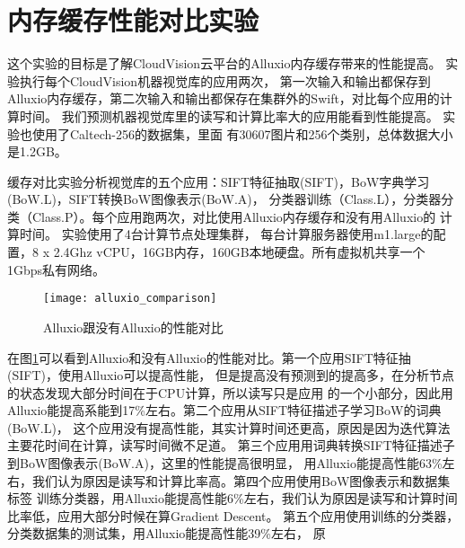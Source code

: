 \section{内存缓存性能对比实验}
\label{sec:memory-cache-experiment}
这个实验的目标是了解CloudVision云平台的Alluxio内存缓存带来的性能提高。
实验执行每个CloudVision机器视觉库的应用两次，
第一次输入和输出都保存到Alluxio内存缓存，第二次输入和输出都保存在集群外的Swift，对比每个应用的计算时间。
我们预测机器视觉库里的读写和计算比率大的应用能看到性能提高。
实验也使用了Caltech-256的数据集，里面
有30607图片和256个类别，总体数据大小是1.2GB。

缓存对比实验分析视觉库的五个应用：SIFT特征抽取(SIFT)，BoW字典学习(BoW.L)，SIFT转换BoW图像表示(BoW.A)，
分类器训练（Class.L），分类器分类（Class.P）。每个应用跑两次，对比使用Alluxio内存缓存和没有用Alluxio的
计算时间。
实验使用了4台计算节点处理集群，
每台计算服务器使用m1.large的配置，8 x 2.4Ghz vCPU，16GB内存，160GB本地硬盘。所有虚拟机共享一个
1Gbps私有网络。

\begin{figure}[h]
  \centering
    \texttt{[image: alluxio\_comparison]}
  \caption{Alluxio跟没有Alluxio的性能对比}
  \label{fig:alluxio-comparison}
\end{figure}

在图\ref{fig:alluxio-comparison}可以看到Alluxio和没有Alluxio的性能对比。第一个应用SIFT特征抽(SIFT)，使用Alluxio可以提高性能，
但是提高没有预测到的提高多，在分析节点的状态发现大部分时间在于CPU计算，所以读写只是应用
的一个小部分，因此用Alluxio能提高系能到17\%左右。第二个应用从SIFT特征描述子学习BoW的词典(BoW.L)，
这个应用没有提高性能，其实计算时间还更高，原因是因为迭代算法主要花时间在计算，读写时间微不足道。
第三个应用用词典转换SIFT特征描述子到BoW图像表示(BoW.A)，这里的性能提高很明显，
用Alluxio能提高性能63\%左右，我们认为原因是读写和计算比率高。第四个应用使用BoW图像表示和数据集标签
训练分类器，用Alluxio能提高性能6\%左右，我们认为原因是读写和计算时间比率低，应用大部分时候在算Gradient Descent。
第五个应用使用训练的分类器，分类数据集的测试集，用Alluxio能提高性能39\%左右，
原
